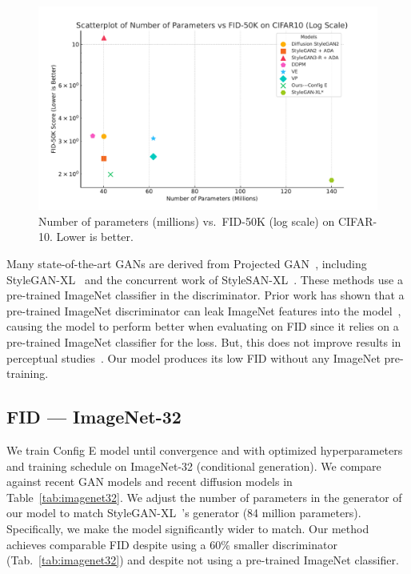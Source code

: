 \begin{figure}[h]
    \centering
    \includegraphics[width=\linewidth,clip,trim={0 0 0 2cm}]{figures/Scatterplot_FID_Parameters_CIFAR10_Log_Custom_Format.pdf}
    \caption{Number of parameters (millions) vs.~FID-50K (log scale) on CIFAR-10. Lower is better.}
    \label{fig:fid-50k-vs-params-cifar-10}
\end{figure}

Many state-of-the-art GANs are derived from Projected GAN~\cite{sauer2021projected}, including StyleGAN-XL~\cite{sgxl} and the concurrent work of StyleSAN-XL~\cite{takida2024san}. These methods use a pre-trained ImageNet classifier in the discriminator. Prior work has shown that a pre-trained ImageNet discriminator can leak ImageNet features into the model~\cite{kynkaanniemi2022role}, causing the model to perform better when evaluating on FID since it relies on a pre-trained ImageNet classifier for the loss. But, this does not improve results in perceptual studies~\cite{kynkaanniemi2022role}. Our model produces its low FID without any ImageNet pre-training.

\subsection{FID --- ImageNet-32~\cite{chrabaszcz2017downsampled}}

We train Config E model until convergence and with optimized hyperparameters and training schedule on ImageNet-32 (conditional generation). We compare against recent GAN models and recent diffusion models in Table~\ref{tab:imagenet32}.
We adjust the number of parameters in the generator of our model to match StyleGAN-XL~\cite{sgxl}'s generator (84 million parameters). Specifically, we make the model significantly wider to match. Our method achieves comparable FID despite using a 60\% smaller discriminator (Tab.~\ref{tab:imagenet32}) and despite not using a pre-trained ImageNet classifier.




